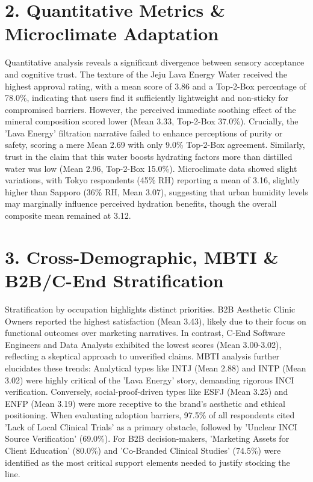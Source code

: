 \documentclass[10pt,twocolumn,a4paper]{article}
\begin{document}
\section{2. Quantitative Metrics \& Microclimate Adaptation}
Quantitative analysis reveals a significant divergence between sensory acceptance and cognitive trust. The texture of the Jeju Lava Energy Water received the highest approval rating, with a mean score of 3.86 and a Top-2-Box percentage of 78.0\%, indicating that users find it sufficiently lightweight and non-sticky for compromised barriers. However, the perceived immediate soothing effect of the mineral composition scored lower (Mean 3.33, Top-2-Box 37.0\%). Crucially, the 'Lava Energy' filtration narrative failed to enhance perceptions of purity or safety, scoring a mere Mean 2.69 with only 9.0\% Top-2-Box agreement. Similarly, trust in the claim that this water boosts hydrating factors more than distilled water was low (Mean 2.96, Top-2-Box 15.0\%). Microclimate data showed slight variations, with Tokyo respondents (45\% RH) reporting a mean of 3.16, slightly higher than Sapporo (36\% RH, Mean 3.07), suggesting that urban humidity levels may marginally influence perceived hydration benefits, though the overall composite mean remained at 3.12.
\section{3. Cross-Demographic, MBTI \& B2B/C-End Stratification}
Stratification by occupation highlights distinct priorities. B2B Aesthetic Clinic Owners reported the highest satisfaction (Mean 3.43), likely due to their focus on functional outcomes over marketing narratives. In contrast, C-End Software Engineers and Data Analysts exhibited the lowest scores (Mean 3.00-3.02), reflecting a skeptical approach to unverified claims. MBTI analysis further elucidates these trends: Analytical types like INTJ (Mean 2.88) and INTP (Mean 3.02) were highly critical of the 'Lava Energy' story, demanding rigorous INCI verification. Conversely, social-proof-driven types like ESFJ (Mean 3.25) and ENFP (Mean 3.19) were more receptive to the brand's aesthetic and ethical positioning. When evaluating adoption barriers, 97.5\% of all respondents cited 'Lack of Local Clinical Trials' as a primary obstacle, followed by 'Unclear INCI Source Verification' (69.0\%). For B2B decision-makers, 'Marketing Assets for Client Education' (80.0\%) and 'Co-Branded Clinical Studies' (74.5\%) were identified as the most critical support elements needed to justify stocking the line.
\end{document}
